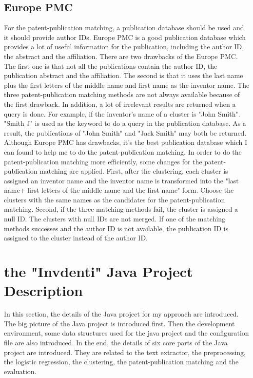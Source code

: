 \subsection{Europe PMC}
For the patent-publication matching, a publication database should be used and it should provide author IDs. Europe PMC is a good publication database which provides a lot of useful information for the publication, including the author ID, the abstract and the affiliation. There are two drawbacks of the Europe PMC. The first one is that not all the publications contain the author ID, the publication abstract and the affiliation. The second  is that it uses the last name plus the first letters of the middle name and first name as the inventor name. The three patent-publication matching methods are not always available  because of the first drawback. In addition, a lot of irrelevant results are returned when a query is done. For example, if the inventor's name of a cluster is "John Smith". "Smith J"  is used as the keyword to do a query in the publication database. As a result, the publications of  "John Smith" and "Jack Smith" may both be returned. Although Europe PMC has drawbacks, it's the best publication database which I can found to help me to do the patent-publication matching. In order to do the patent-publication matching more efficiently, some changes for the patent-publication matching are applied. First, after the clustering, each cluster is assigned an inventor name and the inventor name is transformed into the "last name+ first letters of the middle name and the first name" form. Choose the clusters with the same names as the candidates for the patent-publication matching. Second, if the three matching methods fail, the cluster is assigned a null ID. The clusters with  null IDs are not merged. If one of the matching methods successes and the author ID is not available, the publication ID is assigned to the cluster instead of the author ID.  

\section{the "Invdenti" Java Project Description}
In this section, the details of the Java project for my approach are introduced. The big picture of the Java project is introduced first. Then the development environment, some data structures used for the java project and the configuration file are also introduced. In the end, the details of six core parts of the Java project are introduced. They are related to the text extractor, the preprocessing, the logistic regression, the clustering, the patent-publication matching and the evaluation.

